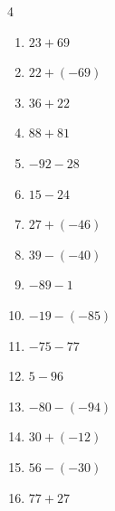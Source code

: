 \begin{multicols}{4}
\begin{enumerate}
        \phantom{$=59$}

  \item $23+69$

        \phantom{$=92$}

  \item $22+(-69)$

        \phantom{$=-47$}

  \item $36+22$

        \phantom{$=58$}

  \item $88+81$

        \phantom{$=169$}

  \item $-92-28$

        \phantom{$=-120$}

  \item $15-24$

        \phantom{$=-9$}

  \item $27+(-46)$

        \phantom{$=-19$}

  \item $39-(-40)$

        \phantom{$=79$}

\columnbreak %

  \item $-89-1$

        \phantom{$=-90$}

  \item $-19-(-85)$

        \phantom{$=66$}

  \item $-75-77$

        \phantom{$=-152$}

  \item $5-96$

        \phantom{$=-91$}

  \item $-80-(-94)$

        \phantom{$=14$}

  \item $30+(-12)$

        \phantom{$=18$}

  \item $56-(-30)$

        \phantom{$=86$}

  \item $77+27$


\end{enumerate}
\end{multicols}
